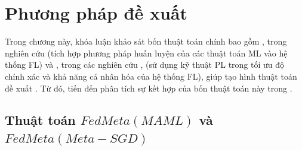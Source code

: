 \chapter{Phương pháp đề xuất}
\label{Chapter3}


Trong chương này, khóa luận khảo sát bốn thuật toán chính bao gồm ,  trong nghiên cứu \cite{chen2018federated} (tích hợp phương pháp huấn luyện của các thuật toán ML vào hệ thống FL) và ,  trong các nghiên cứu \cite{arivazhagan2019federated}, \cite{liang2020think} (sử dụng kỹ thuật PL trong tối ưu độ chính xác và khả năng cá nhân hóa của hệ thống FL), giúp tạo hình thuật toán đề xuất . Từ đó, tiến đến phân tích sự kết hợp của bốn thuật toán này trong .

\section{Thuật toán $FedMeta(MAML)$ và $FedMeta(Meta-SGD)$}

